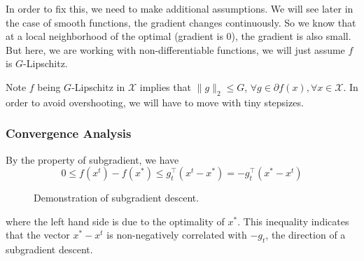 \documentclass{scrartcl}
\newcommand{\sX}{\mathcal{X}}
\begin{document}
In order to fix this, we need to make additional assumptions. We will see later in the case of
smooth functions, the gradient changes continuously. So we know that at a local neighborhood of the
optimal (gradient is 0), the gradient is also small. But here, we are working with
non-differentiable functions, we will just assume $f$ is $G$-Lipschitz.

Note $f$ being $G$-Lipschitz in $\sX$ implies that $\|g\|_2 \leq G$, $\forall g\in\partial f(x),
\forall x\in\sX$. In order to avoid overshooting, we will have to move with tiny stepsizes.

\subsubsection{Convergence Analysis}
\label{sec:subgrad-lipschitz-analysis}

By the property of subgradient, we have
\begin{equation}
  0\leq f(x^t) - f(x^*) \leq g_t^\top (x^t-x^*) = -g_t^\top (x^*-x^t)
  \label{eq:subgrad-lower-bound-f}
\end{equation}
\begin{figure}
\centering
{}
\caption{Demonstration of subgradient descent.}
\label{fig:subgrad-descent-demo}
\end{figure}
where the left hand side is due to the optimality of $x^*$. This inequality indicates that the
vector $x^*-x^t$ is non-negatively correlated with $-g_t$, the direction of a subgradient descent.
\end{document}
